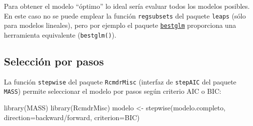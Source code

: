 \documentclass[
]{book}
\newenvironment{Shaded}{\begin{snugshade}}{\end{snugshade}}
\newcommand{\AttributeTok}[1]{\textcolor[rgb]{0.77,0.63,0.00}{#1}}
\newcommand{\FunctionTok}[1]{\textcolor[rgb]{0.00,0.00,0.00}{#1}}
\newcommand{\NormalTok}[1]{#1}
\newcommand{\OtherTok}[1]{\textcolor[rgb]{0.56,0.35,0.01}{#1}}
\newcommand{\StringTok}[1]{\textcolor[rgb]{0.31,0.60,0.02}{#1}}
\theoremstyle{break}
\begin{document}
Para obtener el modelo ``óptimo'' lo ideal sería evaluar todos los modelos posibles.
En este caso no se puede emplear la función \texttt{regsubsets} del paquete \texttt{leaps} (sólo para modelos lineales),
pero por ejemplo el paquete
\href{https://cran.r-project.org/web/packages/bestglm/vignettes/bestglm.pdf}{\texttt{bestglm}}
proporciona una herramienta equivalente (\texttt{bestglm()}).

\hypertarget{selecciuxf3n-por-pasos-1}{%
\subsection{Selección por pasos}\label{selecciuxf3n-por-pasos-1}}

La función \texttt{stepwise} del paquete \texttt{RcmdrMisc} (interfaz de \texttt{stepAIC} del paquete \texttt{MASS})
permite seleccionar el modelo por pasos según criterio AIC o BIC:

\begin{Shaded}
\begin{Highlighting}[]
\FunctionTok{library}\NormalTok{(MASS)}
\FunctionTok{library}\NormalTok{(RcmdrMisc)}
\NormalTok{modelo }\OtherTok{\textless{}{-}} \FunctionTok{stepwise}\NormalTok{(modelo.completo, }\AttributeTok{direction=}\StringTok{\textquotesingle{}backward/forward\textquotesingle{}}\NormalTok{, }\AttributeTok{criterion=}\StringTok{\textquotesingle{}BIC\textquotesingle{}}\NormalTok{)}
\end{Highlighting}
\end{Shaded}
\end{document}
